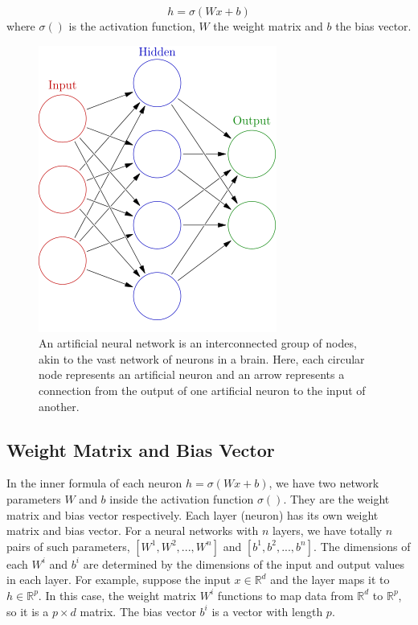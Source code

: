 \documentclass[12pt]{report} %
\begin{document}
\begin{equation}
h=\sigma(Wx+b)
\end{equation}
where $\sigma()$ is the activation function, $W$ the weight matrix and $b$ the bias vector.
\begin{figure}[H]
	\centering
	\includegraphics[scale=0.7]{pictures/neural_network.png}
	\caption{An artificial neural network is an interconnected group of nodes, akin to the vast network of neurons in a brain. Here, each circular node represents an artificial neuron and an arrow represents a connection from the output of one artificial neuron to the input of another\cite{NNPIC}.}
	\label{fig:2}
\end{figure}

\subsection{Weight Matrix and Bias Vector}
In the inner formula of each neuron $h=\sigma(Wx+b)$, we have two network parameters $W$ and $b$ inside the activation function $\sigma()$. They are the weight matrix and bias vector respectively. Each layer (neuron) has its own weight matrix and bias vector. For a neural networks with $n$ layers, we have totally $n$ pairs of such parameters, $[W^1, W^2,...,W^n]$ and $[b^1,b^2,...,b^n]$. The dimensions of each $W^i$ and $b^i$ are determined by the dimensions of the input and output values in each layer. For example, suppose the input \(x\in \mathbb{R}^{d}\) and the layer maps it to \(h\in \mathbb{R}^{p}\). In this case, the weight matrix $W^i$ functions to map data from $\mathbb{R}^{d}$ to $\mathbb{R}^{p}$, so it is a $p \times d$ matrix. The bias vector $b^i$ is a vector with length $p$.
\end{document}
